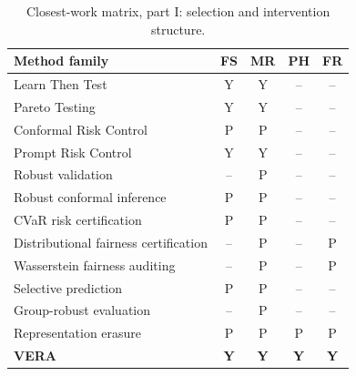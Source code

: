 \begin{table}[t]
\centering\scriptsize
\begin{tabular}{@{}lcccc@{}}
\toprule
Method family & FS & MR & PH & FR \\
\midrule
Learn Then Test \cite{angelopoulos2025ltt} & Y & Y & -- & -- \\
Pareto Testing \cite{laufer2023pareto} & Y & Y & -- & -- \\
Conformal Risk Control \cite{angelopoulos2024crc} & P & P & -- & -- \\
Prompt Risk Control \cite{zollo2024prompt} & Y & Y & -- & -- \\
Robust validation \cite{cauchois2024robust} & -- & P & -- & -- \\
Robust conformal inference \cite{ai2024finegrained} & P & P & -- & -- \\
CVaR risk certification \cite{thomas2019cvar} & P & P & -- & -- \\
Distributional fairness certification \cite{kang2022certifying} & -- & P & -- & P \\
Wasserstein fairness auditing \cite{ehyaei2025fragile} & -- & P & -- & P \\
Selective prediction \cite{elyaniv2010foundations,geifman2019selectivenet} & P & P & -- & -- \\
Group-robust evaluation \cite{sagawa2020groupdro,koh2021wilds} & -- & P & -- & -- \\
Representation erasure \cite{ravfogel2020null,ravfogel2022linear,belrose2023leace} & P & P & P & P \\
\textbf{VERA} & \textbf{Y} & \textbf{Y} & \textbf{Y} & \textbf{Y} \\
\bottomrule
\end{tabular}
\caption{Closest-work matrix, part I: selection and intervention structure.}
\label{tab:novelty-a}
\end{table}

